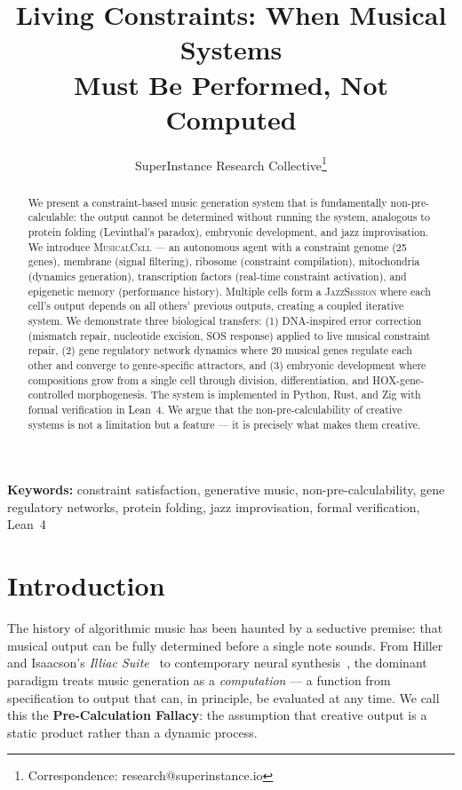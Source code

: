 \documentclass[11pt,a4paper]{article}
\title{\textbf{Living Constraints: When Musical Systems\\Must Be Performed, Not Computed}}
\author{SuperInstance Research Collective\thanks{Correspondence: research@superinstance.io}}
\date{}
\newcommand{\MusicalCell}{\textsc{MusicalCell}}
\newcommand{\JazzSession}{\textsc{JazzSession}}
\begin{document}
\maketitle

\begin{abstract}
We present a constraint-based music generation system that is fundamentally non-pre-calculable: the output cannot be determined without running the system, analogous to protein folding (Levinthal's paradox), embryonic development, and jazz improvisation. We introduce \MusicalCell{} --- an autonomous agent with a constraint genome (25 genes), membrane (signal filtering), ribosome (constraint compilation), mitochondria (dynamics generation), transcription factors (real-time constraint activation), and epigenetic memory (performance history). Multiple cells form a \JazzSession{} where each cell's output depends on all others' previous outputs, creating a coupled iterative system. We demonstrate three biological transfers: (1) DNA-inspired error correction (mismatch repair, nucleotide excision, SOS response) applied to live musical constraint repair, (2) gene regulatory network dynamics where 20 musical genes regulate each other and converge to genre-specific attractors, and (3) embryonic development where compositions grow from a single cell through division, differentiation, and HOX-gene-controlled morphogenesis. The system is implemented in Python, Rust, and Zig with formal verification in Lean~4. We argue that the non-pre-calculability of creative systems is not a limitation but a feature --- it is precisely what makes them creative.
\end{abstract}

\medskip
\noindent\textbf{Keywords:} constraint satisfaction, generative music, non-pre-calculability, gene regulatory networks, protein folding, jazz improvisation, formal verification, Lean~4

\tableofcontents
\newpage

\section{Introduction}\label{sec:intro}

The history of algorithmic music has been haunted by a seductive premise: that musical output can be fully determined before a single note sounds. From Hiller and Isaacson's \textit{Illiac Suite}~\citep{hiller1959} to contemporary neural synthesis~\citep{dhariwal2020}, the dominant paradigm treats music generation as a \emph{computation} --- a function from specification to output that can, in principle, be evaluated at any time. We call this the \textbf{Pre-Calculation Fallacy}: the assumption that creative output is a static product rather than a dynamic process.
\end{document}
